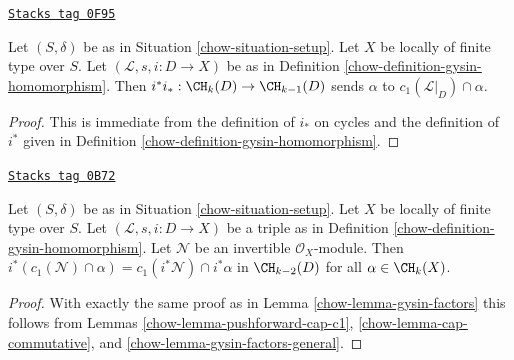 \begin{lemma}
\label{chow-lemma-gysin-back}
\href{https://stacks.math.columbia.edu/tag/0F95}{\texttt{Stacks tag 0F95}}

Let $(S, \delta)$ be as in Situation \ref{chow-situation-setup}. Let $X$ be locally
of finite type over $S$. Let $(\mathcal{L}, s, i : D \to X)$ be as in
Definition \ref{chow-definition-gysin-homomorphism}. Then
$i^*i_* : \CH_k(D) \to \CH_{k - 1}(D)$ sends $\alpha$ to
$c_1(\mathcal{L}|_D) \cap \alpha$.
\end{lemma}

\begin{proof}

This is immediate from the definition of $i_*$ on cycles
and the definition of $i^*$ given in
Definition \ref{chow-definition-gysin-homomorphism}.
\end{proof}

\begin{lemma}
\label{chow-lemma-gysin-commutes-cap-c1}
\href{https://stacks.math.columbia.edu/tag/0B72}{\texttt{Stacks tag 0B72}}

Let $(S, \delta)$ be as in Situation \ref{chow-situation-setup}. Let $X$ be
locally of finite type over $S$. Let $(\mathcal{L}, s, i : D \to X)$
be a triple as in Definition \ref{chow-definition-gysin-homomorphism}.
Let $\mathcal{N}$ be an invertible $\mathcal{O}_X$-module.
Then $i^*(c_1(\mathcal{N}) \cap \alpha) = c_1(i^*\mathcal{N}) \cap i^*\alpha$
in $\CH_{k - 2}(D)$ for all $\alpha \in \CH_k(X)$.
\end{lemma}

\begin{proof}

With exactly the same proof as in Lemma \ref{chow-lemma-gysin-factors}
this follows from Lemmas
\ref{chow-lemma-pushforward-cap-c1},
\ref{chow-lemma-cap-commutative}, and
\ref{chow-lemma-gysin-factors-general}.
\end{proof}

